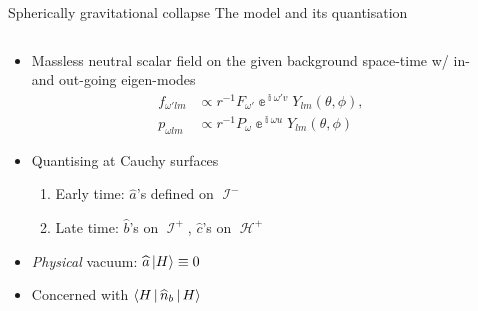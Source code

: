 \documentclass{beamer}
\newcommand{\ii}{{\Bbbi}}
\newcommand{\ee}{{\Bbbe}}
\newcommand{\rfun}[2]{{#1}\mathopen{}\left(#2\right)\mathclose{}}
\newcommand{\what}[1]{{\widehat{#1}}}
\begin{document}
\begin{frame}{Spherically gravitational collapse}%
{The model and its quantisation}
\begin{columns}
\begin{column}{.61\textwidth}
\begin{itemize}
\item Massless neutral scalar field on the given background space-time w/
in- and out-going eigen-modes
\begin{align*}
f_{\omega'lm} &\propto r^{-1}F_{\omega'}\ee^{\ii\omega' v}
\rfun{Y_{lm}}{\theta,\phi}, \\
p_{\omega lm} &\propto r^{-1}P_{\omega}\ee^{\ii\omega u}
\rfun{Y_{lm}}{\theta,\phi}
\end{align*}
\item Quantising at Cauchy surfaces
\begin{enumerate}
\item Early time: $\what{a}$'s defined on $\mscrI^-$
\item Late time: $\what{b}$'s on $\mscrI^+$, $\what{c}$'s on $\mscrH^+$
\end{enumerate}
\item \emph{Physical} vacuum: $\what{a}\Ket{H} \equiv 0$
\item Concerned with $\Braket{H | \what{n}_b | H}$
\end{itemize}
\end{column}
\begin{column}[c]{.38\textwidth}
\end{column}
\end{columns}
\end{frame}
\end{document}
